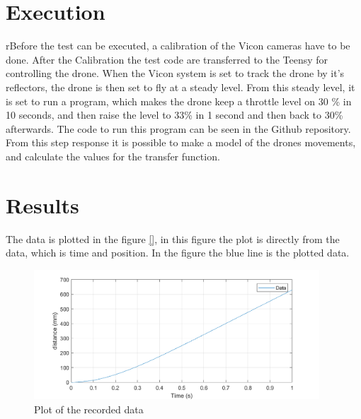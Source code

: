 \section*{Execution}
rBefore the test can be executed, a calibration of the Vicon cameras have to be done. After the Calibration the test code are transferred to the Teensy for controlling the drone. When the Vicon system is set to track the drone by it's reflectors, the drone is then set to fly at a steady level. From this steady level, it is set to run a program, which makes the drone keep a throttle level on 30 \% in 10 seconds, and then raise the level to 33\% in 1 second and then back to 30\% afterwards. The code to run this program can be seen in the Github repository. From this step response it is possible to make a model of the drones movements, and calculate the values for the transfer function. 



\section*{Results}
The data is plotted in the figure \ref{}, in this figure the plot is directly from the data, which is time and position. In the figure the blue line is the plotted data.

\begin{figure}[H]
    \centering
    \includegraphics[width=0.95\textwidth]{figures/Appendix/measuringTest/DroneTest.png}
    \caption{Plot of the recorded data}
    \label{fig:positiontime}
\end{figure}

